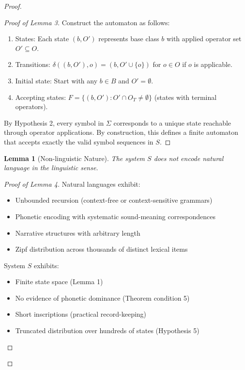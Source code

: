 \documentclass[12pt,a4paper]{article}
\newtheorem{lemma}{Lemma}
\begin{document}
\begin{proof}
\begin{proof}[Proof of Lemma 3]
Construct the automaton as follows:
\begin{enumerate}
    \item States: Each state $(b, O')$ represents base class $b$ with applied operator set $O' \subseteq O$.
    \item Transitions: $\delta((b, O'), o) = (b, O' \cup \{o\})$ for $o \in O$ if $o$ is applicable.
    \item Initial state: Start with any $b \in B$ and $O' = \emptyset$.
    \item Accepting states: $F = \{(b, O') : O' \cap O_T \neq \emptyset\}$ (states with terminal operators).
\end{enumerate}

By Hypothesis 2, every symbol in $\Sigma$ corresponds to a unique state reachable through operator applications. By construction, this defines a finite automaton that accepts exactly the valid symbol sequences in $S$.
\end{proof}

\begin{lemma}[Non-linguistic Nature]
The system $S$ does not encode natural language in the linguistic sense.
\end{lemma}

\begin{proof}[Proof of Lemma 4]
Natural languages exhibit:
\begin{itemize}
    \item Unbounded recursion (context-free or context-sensitive grammars)
    \item Phonetic encoding with systematic sound-meaning correspondences
    \item Narrative structures with arbitrary length
    \item Zipf distribution across thousands of distinct lexical items
\end{itemize}

System $S$ exhibits:
\begin{itemize}
    \item Finite state space (Lemma 1)
    \item No evidence of phonetic dominance (Theorem condition 5)
    \item Short inscriptions (practical record-keeping)
    \item Truncated distribution over hundreds of states (Hypothesis 5)
\end{itemize}


\end{proof}
\end{proof}
\end{document}
